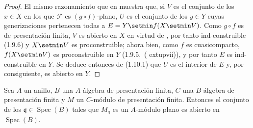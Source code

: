 \begin{proof}
El mismo razonamiento que en  muestra que, si $V$ es el conjunto de los $x\in X$ en los que $\mathcal F$ es $(g\circ f)$-plano, $U$ es el conjunto de los $y\in Y$ cuyas generizaciones pertenecen todas a $E=Y\setmin f(X\setmin V)$. Como $g\circ f$ es de presentación finita, $V$ es abierto en $X$ en virtud de , por tanto ind-construible (1.9.6) y $X\setmin V$ es proconstruible; ahora bien, como $f$ es cuasicompacto, $f(X\setmin V)$ es proconstruible en $Y$ (1.9.5,~(	extup{vii})), y por tanto $E$ es ind-construible en $Y$. Se deduce entonces de (1.10.1) que $U$ es el interior de $E$ y, por consiguiente, es abierto en $Y$.
\end{proof}

\begin{corollary}[11.3.3]
\label{IV.11.3.3}
Sea $A$ un anillo, $B$ una $A$-álgebra de presentación finita, $C$ una $B$-álgebra de presentación finita y $M$ un $C$-módulo de presentación finita. Entonces el conjunto de los $\mathfrak q\in\operatorname{Spec}(B)$ tales que $M_\mathfrak q$ es un $A$-módulo plano es abierto en $\operatorname{Spec}(B)$.
\end{corollary}

